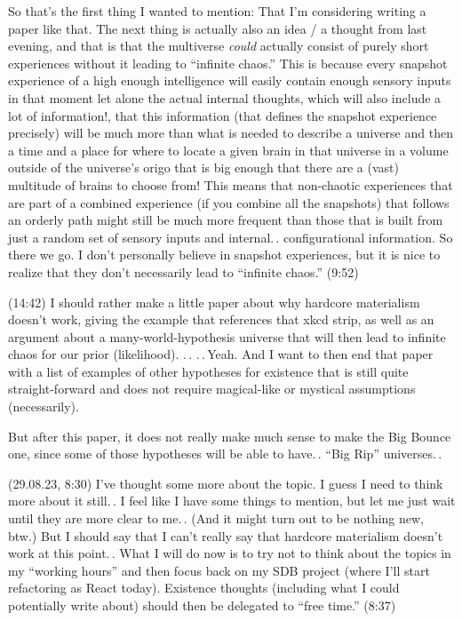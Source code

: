 \documentclass{report}
\begin{document}
So that's the first thing I wanted to mention: That I'm considering writing a paper like that. The next thing is actually also an idea / a thought from last evening, and that is that the multiverse \emph{could} actually consist of purely short experiences without it leading to ``infinite chaos.'' This is because every snapshot experience of a high enough intelligence will easily contain enough sensory inputs in that moment let alone the actual internal thoughts, which will also include a lot of information!, that this information (that defines the snapshot experience precisely) will be much more than what is needed to describe a universe and then a time and a place for where to locate a given brain in that universe in a volume outside of the universe's origo that is big enough that there are a (vast) multitude of brains to choose from! This means that non-chaotic experiences that are part of a combined experience (if you combine all the snapshots) that follows an orderly path might still be much more frequent than those that is built from just a random set of sensory inputs and internal.\,. configurational information. So there we go. I don't personally believe in snapshot experiences, but it is nice to realize that they don't necessarily lead to ``infinite chaos.'' (9:52)

(14:42) I should rather make a little paper about why hardcore materialism doesn't work, giving the example that references that xkcd strip, as well as an argument about a many-world-hypothesis universe that will then lead to infinite chaos for our prior (likelihood). .\,. .\,.\,Yeah. And I want to then end that paper with a list of examples of other hypotheses for existence that is still quite straight-forward and does not require magical-like or mystical assumptions (necessarily).

But after this paper, it does not really make much sense to make the Big Bounce one, since some of those hypotheses will be able to have.\,. ``Big Rip'' universes.\,.

(29.08.23, 8:30) I've thought some more about the topic. I guess I need to think more about it still.\,. I feel like I have some things to mention, but let me just wait until they are more clear to me.\,. (And it might turn out to be nothing new, btw.) But I should say that I can't really say that hardcore materialism doesn't work at this point.\,. What I will do now is to try not to think about the topics in my ``working hours'' and then focus back on my SDB project (where I'll start refactoring as React today). Existence thoughts (including what I could potentially write about) should then be delegated to ``free time.'' (8:37)
\end{document}
